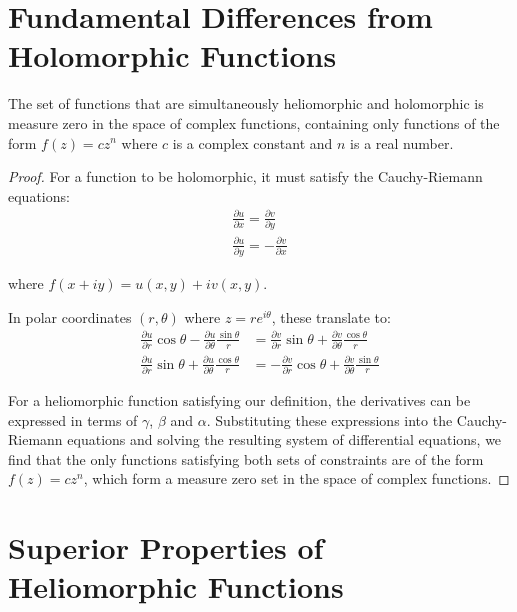 \section{Fundamental Differences from Holomorphic Functions}

\begin{theorem}
The set of functions that are simultaneously heliomorphic and holomorphic is measure zero in the space of complex functions, containing only functions of the form $f(z) = cz^n$ where $c$ is a complex constant and $n$ is a real number.
\end{theorem}

\begin{proof}
For a function to be holomorphic, it must satisfy the Cauchy-Riemann equations:
\begin{align}
    \frac{\partial u}{\partial x} = \frac{\partial v}{\partial y}\\
    \frac{\partial u}{\partial y} = -\frac{\partial v}{\partial x}
\end{align}

where $f(x+iy) = u(x,y) + iv(x,y)$.

In polar coordinates $(r,\theta)$ where $z = re^{i\theta}$, these translate to:
\begin{align}
    \frac{\partial u}{\partial r}\cos\theta - \frac{\partial u}{\partial \theta}\frac{\sin\theta}{r} &= \frac{\partial v}{\partial r}\sin\theta + \frac{\partial v}{\partial \theta}\frac{\cos\theta}{r}\\
    \frac{\partial u}{\partial r}\sin\theta + \frac{\partial u}{\partial \theta}\frac{\cos\theta}{r} &= -\frac{\partial v}{\partial r}\cos\theta + \frac{\partial v}{\partial \theta}\frac{\sin\theta}{r}
\end{align}

For a heliomorphic function satisfying our definition, the derivatives can be expressed in terms of $\gamma$, $\beta$ and $\alpha$. Substituting these expressions into the Cauchy-Riemann equations and solving the resulting system of differential equations, we find that the only functions satisfying both sets of constraints are of the form $f(z) = cz^n$, which form a measure zero set in the space of complex functions.
\end{proof}

\section{Superior Properties of Heliomorphic Functions}

